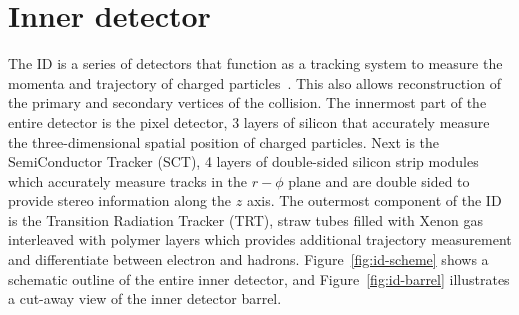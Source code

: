 \section{Inner detector}
The ID is a series of detectors that function as a tracking system to measure the momenta and trajectory of charged particles~\cite{cern-jinst-atlas}. This also allows reconstruction of the primary and secondary vertices of the collision. The innermost part of the entire detector is the pixel detector, 3 layers of silicon that accurately measure the three-dimensional spatial position of charged particles. Next is the SemiConductor Tracker (SCT), 4 layers of double-sided silicon strip modules which accurately measure tracks in the $r-\phi$ plane and are double sided to provide stereo information along the $z$ axis. The outermost component of the ID is the Transition Radiation Tracker (TRT), straw tubes filled with Xenon gas interleaved with polymer layers which provides additional trajectory measurement and differentiate between electron and hadrons. Figure~\ref{fig:id-scheme} shows a schematic outline of the entire inner detector, and Figure~\ref{fig:id-barrel} illustrates a cut-away view of the inner detector barrel.

